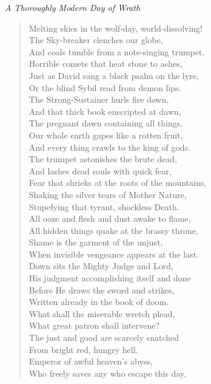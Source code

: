 \emph{A Thoroughly Modern Day of Wrath}

\begin{verse}
Melting skies in the wolf-day, world-dissolving!\\
The Sky-breaker clenches our globe,\\
And coals tumble from a note-singing trumpet,\\
Horrible comets that heat stone to ashes,\\
Just as David sang a black psalm on the lyre,\\
Or the blind Sybil read from demon lips.\\
The Strong-Sustainer hurls fire down,\\
And that thick book enscripted at dawn,\\
The pregnant dawn containing all things.\\
Our whole earth gapes like a rotten fruit,\\
And every thing crawls to the king of gods.\\
The trumpet astonishes the brute dead,\\
And lashes dead souls with quick fear,\\
Fear that shrieks at the roots of the mountains,\\
Shaking the silver tears of Mother Nature,\\
Stupefying that tyrant, shockless Death.\\
All ooze and flesh and dust awake to flame,\\
All hidden things quake at the brassy throne,\\
Shame is the garment of the unjust,\\
When invisible vengeance appears at the last.\\
Down sits the Mighty Judge and Lord,\\
His judgment accomplishing itself and done\\
Before He draws the sword and strikes,\\
Written already in the book of doom.\\
What shall the miserable wretch plead,\\
What great patron shall intervene?\\
The just and good are scarcely snatched\\
From bright red, hungry hell.\\
Emperor of awful heaven's abyss,\\
Who freely saves any who escape this day,\\

\end{verse}
